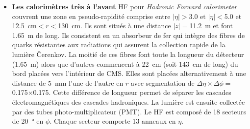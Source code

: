 \begin{itemize}[label=$\bullet$]
	numérotés $-$\num{2}, $-$\num{1}, \num{0}, $+$\num{1}, $+$\num{2} et de centre $z=-$\num{5.324}, \num{2.686}, \num{0}, \num{2.686} et \SI{5.324}{\meter} respectivement. Le premier anneau est composé de deux couches de scintillateurs de \SI{10}{\milli\meter} d'épaisseur placées en $r=$\SI{3.82}{\meter} et \SI{4.07}{\meter}. Les autres anneaux ne possèdent qu'une couche de scintillateur placé à $r=$\SI{4.07}{\meter}. Chaque anneau est segmenté en \num{12} secteurs en $\phi$. Et chaque secteur est segmenté en \num{8}, \num{6} et \num{5} tuiles de scintillateurs (cf.Fig~\ref{SCINTI}) pour les anneaux \num{0}, $\pm$\num{1}, $\pm$\num{2} respectivement.
	\item \textbf{Les calorimètres très à l'avant} HF pour \textit{Hadronic Forward calorimeter} couvrent une zone en pseudo-rapidité comprise entre $|\eta|>$\num{3.0} et $|\eta|<$\num{5.0} et \SI{12.5}{\centi\meter}$<r<$\SI{130}{\centi\meter}. Ils sont situés à une distance $|z|=$\SI{11.2}{\meter} et font \SI{1.65}{\meter} de long. Ils consistent en un absorbeur de fer qui intègre des fibres de quarks résistantes aux radiations qui assurent la collection rapide de la lumière Čerenkov. La moitié de ces fibres font toute la longueur du détecteur (\SI{1.65}{\meter}) alors que d'autres commencent à \SI{22}{\centi\meter} (soit \SI{143}{\centi\meter} de long) du bord placées vers l'intérieur de CMS. Elles sont placées alternativement à une distance de \SI{5}{\milli\meter} l'une de l'autre en $r$  avec segmentation de $\Delta\eta\times\Delta\phi=$\num{0.175}$\times$\num{0.175}. Cette différence de longueur permet de séparer les cascades électromagnétiques des cascades hadroniques. La lumière est ensuite collectée par des tubes photo-multiplicateur (PMT). Le HF est composé de \num{18} secteurs de \SI{20}{\degree} en $\phi$. Chaque secteur comporte \num{13} anneaux en $\eta$.
\end{itemize}
